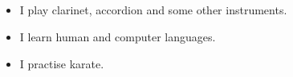 \documentclass[a4paper]{article}
\begin{document}
\subsection*{}
\begin{itemize}
\item
	I play clarinet, accordion and some other instruments.
\item
  I learn human and computer languages.
\item
  I practise karate.
\end{itemize}
\end{document}
